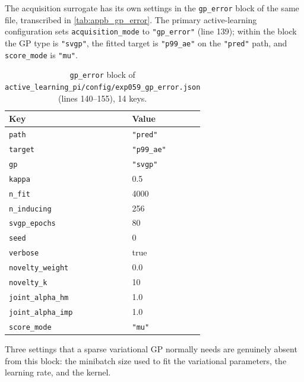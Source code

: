 The acquisition surrogate has its own settings in the \texttt{gp\_error} block of the same
file, transcribed in \autoref{tab:appb_gp_error}. The primary active-learning
configuration sets \texttt{acquisition\_mode} to \texttt{"gp\_error"} (line 139); within
the block the GP type is \texttt{"svgp"}, the fitted target is \texttt{"p99\_ae"} on the
\texttt{"pred"} path, and \texttt{score\_mode} is \texttt{"mu"}.

\begin{table}[htbp]
\centering
\caption{\texttt{gp\_error} block of
\texttt{active\_learning\_pi/config/exp059\_gp\_error.json} (lines 140--155), 14 keys.}
\label{tab:appb_gp_error}
\begin{tabular}{@{}lp{}@{}}
\hline
Key & Value \\
\hline
\texttt{path} & \texttt{"pred"} \\
\texttt{target} & \texttt{"p99\_ae"} \\
\texttt{gp} & \texttt{"svgp"} \\
\texttt{kappa} & 0.5 \\
\texttt{n\_fit} & 4000 \\
\texttt{n\_inducing} & 256 \\
\texttt{svgp\_epochs} & 80 \\
\texttt{seed} & 0 \\
\texttt{verbose} & true \\
\texttt{novelty\_weight} & 0.0 \\
\texttt{novelty\_k} & 10 \\
\texttt{joint\_alpha\_hm} & 1.0 \\
\texttt{joint\_alpha\_imp} & 1.0 \\
\texttt{score\_mode} & \texttt{"mu"} \\
\hline
\end{tabular}
\end{table}

Three settings that a sparse variational GP normally needs are genuinely absent from this
block: the minibatch size used to fit the variational parameters, the learning rate, and
the kernel.

